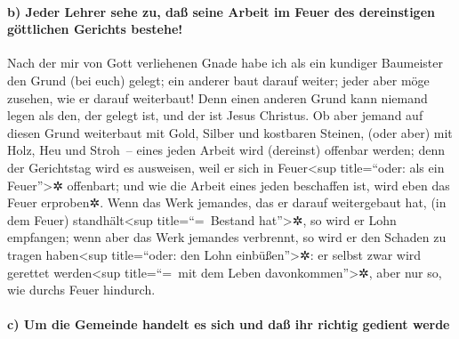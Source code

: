 \hypertarget{b-jeder-lehrer-sehe-zu-dauxdf-seine-arbeit-im-feuer-des-dereinstigen-guxf6ttlichen-gerichts-bestehe}{%
\paragraph{b) Jeder Lehrer sehe zu, daß seine Arbeit im Feuer des
dereinstigen göttlichen Gerichts
bestehe!}\label{b-jeder-lehrer-sehe-zu-dauxdf-seine-arbeit-im-feuer-des-dereinstigen-guxf6ttlichen-gerichts-bestehe}}

 Nach der mir von Gott verliehenen Gnade habe ich als ein
kundiger Baumeister den Grund (bei euch) gelegt; ein anderer baut darauf
weiter; jeder aber möge zusehen, wie er darauf weiterbaut!
 Denn einen anderen Grund kann niemand legen als den, der
gelegt ist, und der ist Jesus Christus.  Ob aber jemand
auf diesen Grund weiterbaut mit Gold, Silber und kostbaren Steinen,
(oder aber) mit Holz, Heu und Stroh~--  eines jeden
Arbeit wird (dereinst) offenbar werden; denn der Gerichtstag wird es
ausweisen, weil er sich in Feuer\textless sup title=``oder: als ein
Feuer''\textgreater✲ offenbart; und wie die Arbeit eines jeden
beschaffen ist, wird eben das Feuer erproben✲.  Wenn das
Werk jemandes, das er darauf weitergebaut hat, (in dem Feuer)
standhält\textless sup title=``=~Bestand hat''\textgreater✲, so wird er
Lohn empfangen;  wenn aber das Werk jemandes verbrennt,
so wird er den Schaden zu tragen haben\textless sup title=``oder: den
Lohn einbüßen''\textgreater✲: er selbst zwar wird gerettet
werden\textless sup title=``=~mit dem Leben davonkommen''\textgreater✲,
aber nur so, wie durchs Feuer hindurch.

\hypertarget{c-um-die-gemeinde-handelt-es-sich-und-dauxdf-ihr-richtig-gedient-werde}{%
\paragraph{c) Um die Gemeinde handelt es sich und daß ihr richtig
gedient
werde}\label{c-um-die-gemeinde-handelt-es-sich-und-dauxdf-ihr-richtig-gedient-werde}}

